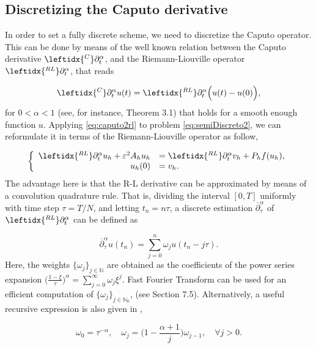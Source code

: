 \documentclass{amsart}
\newcommand{\pp}{\overline{\partial}}
\newcommand{\rl}{\leftidx{^{RL}}\partial_t^\alpha}
\newcommand{\ppa}{\leftidx{^C}\partial_t^\alpha}
\newcommand{\w}{\omega}
\newcommand{\eps}{\varepsilon}
\def\N{{\mathbb {N}}}
\theoremstyle{remark}
\theoremstyle{definition}
\numberwithin{equation}{section}
\begin{document}
\subsection{Discretizing the Caputo derivative}

In order to set a fully discrete scheme, we need to discretize the Caputo operator. This can be done by means of the well known relation between the Caputo derivative $\ppa$, and the Riemann-Liouville operator $\rl$, that reads

\begin{equation}
\label{eq:caputo2rl}
\ppa u(t) = \rl \Big( u(t) - u(0) \Big),
\end{equation}
for $0<\alpha<1$ (see, for instance, \cite{Diethelm} Theorem 3.1) that holds for a smooth enough function $u$. Applying \eqref{eq:caputo2rl} to problem \eqref{eq:semiDiscreto2}, we can reformulate it in terms of the Riemann-Liouville operator as follow,

\begin{equation} 
\left\lbrace
  \begin{array}{rl}
      \rl u_h   +  \eps^2A_h u_h & = \rl v_h + P_hf(u_h), \\
      u_h(0) & = v_h.
      \end{array}
\label{eq:semiDiscreto2rl}
\right.
\end{equation} 
The advantage here is that the R-L derivative can be approximated by means of a convolution quadrature rule. That is, dividing the interval $[0,T]$ uniformly with time step $\tau = T/N$, and letting $t_n = n\tau$, a discrete estimation $\pp^{\alpha}_{\tau}$ of $\rl$ can be defined as

\begin{equation}
\label{conv_dis}
\pp^{\alpha}_{\tau}u(t_n) = \sum^{n}_{j = 0} \w_j u(t_n - j\tau). 
\end{equation}
Here, the weights $\{\w_j\}_{j \in \N}$ are obtained as the coefficients of the power series expansion $\Big(\frac{1 - \xi}{\tau}\Big)^{\alpha} = \sum^{\infty}_{j=0} \w_j \xi^j. $
Fast Fourier Transform can be used for an efficient computation of $\{\w_j\}_{j\in\N_0}$, (see \cite{Podlubny} Section 7.5). Alternatively, a useful recursive expression is also given in \cite{Podlubny},

\begin{equation}
\label{eq:definicion_pesos}
\w_0 = \tau^{-\alpha}, \quad \w_j = \Big(1 - \frac{\alpha + 1}{j}\Big)\w_{j-1}, \quad \forall j >0.
\end{equation}
\end{document}
